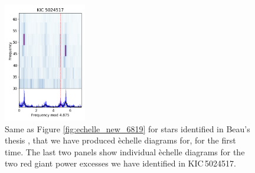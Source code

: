 \begin{figure}
    \includegraphics[width=0.32\textwidth]{Chapter5/5024517_b_echelle.png}
    
    \caption[\'Echelle diagrams for the identified cluster red giants in NGC\,6819 (II)]{Same as Figure \ref{fig:echelle_new_6819} for stars identified in Beau's thesis \citep{bellamy_using_2015}, that we have produced \`echelle diagrams for, for the first time. The last two panels show individual \`echelle diagrams for the two red giant power excesses we have identified in KIC\,5024517.}
    \label{fig:echelle_new2_6819}
\end{figure}